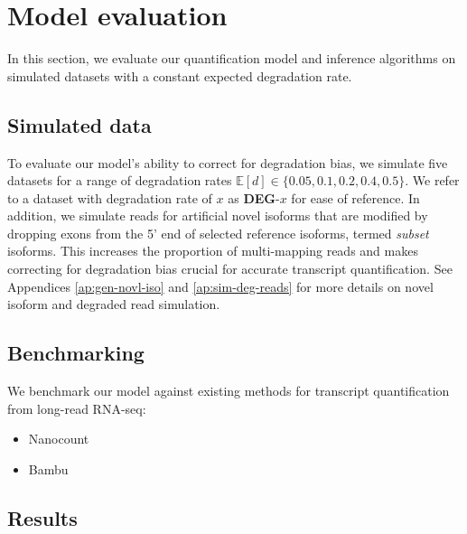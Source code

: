 \section{Model evaluation}

In this section, we evaluate our quantification model and inference algorithms on simulated datasets with a constant expected degradation rate. 

\subsection{Simulated data}

To evaluate our model's ability to correct for degradation bias, we simulate five datasets for a range of degradation rates $\mathbb{E}[d]\in\{0.05,0.1,0.2,0.4,0.5\}$. We refer to a dataset with degradation rate of $x$ as \textbf{DEG}-$x$ for ease of reference. In addition, we simulate reads for artificial novel isoforms that are modified by dropping exons from the 5' end of selected reference isoforms, termed \textit{subset} isoforms. This increases the proportion of multi-mapping reads and makes correcting for degradation bias crucial for accurate transcript quantification. See Appendices \ref{ap:gen-novl-iso} and \ref{ap:sim-deg-reads} for more details on novel isoform and degraded read simulation. 

\subsection{Benchmarking}

We benchmark our model against existing methods for transcript quantification from long-read RNA-seq:
\begin{itemize}
    \item Nanocount
    \item Bambu
\end{itemize}

\subsection{Results}

